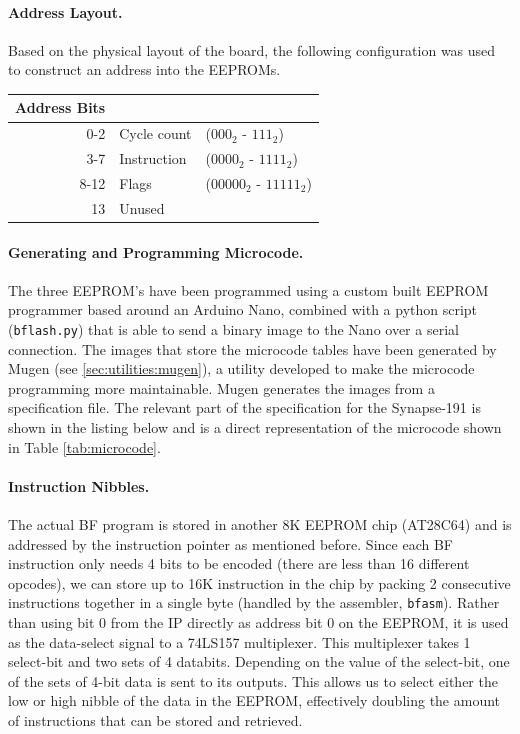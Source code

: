 \paragraph{Address Layout.} Based on the physical layout of the board, the following configuration was used to construct an address into the EEPROMs.
\\
\begin{center}
\begin{tabular}{r|ll} 
  Address Bits & \\ \hline
  0-2  & Cycle count & ($000_2$ - $111_2$) \\
  3-7  & Instruction & ($0000_2$ - $1111_2$) \\
  8-12 & Flags  & ($00000_2$ - $11111_2$) \\
  13   & Unused & 
\end{tabular}
\end{center}


\paragraph{Generating and Programming Microcode.} The three EEPROM's have been programmed using a custom built EEPROM programmer based around an Arduino Nano, combined with a python script (\texttt{bflash.py}) that is able to send a binary image to the Nano over a serial connection. The images that store the microcode tables have been generated by Mugen (see \ref{sec:utilities:mugen}), a utility developed to make the microcode programming more maintainable. Mugen generates the images from a specification file. The relevant part of the specification for the Synapse-191 is shown in the listing below and is a direct representation of the microcode shown in Table \ref{tab:microcode}.

\newpage



\paragraph{Instruction Nibbles.} The actual BF program is stored in another 8K EEPROM chip (AT28C64) and is addressed by the instruction pointer as mentioned before. Since each BF instruction only needs 4 bits to be encoded (there are less than 16 different opcodes), we can store up to 16K instruction in the chip by packing 2 consecutive instructions together in a single byte (handled by the assembler, \texttt{bfasm}). Rather than using bit 0 from the IP directly as address bit 0 on the EEPROM, it is used as the data-select signal to a 74LS157 multiplexer. This multiplexer takes 1 select-bit and two sets of 4 databits. Depending on the value of the select-bit, one of the sets of 4-bit data is sent to its outputs. This allows us to select either the low or high nibble of the data in the EEPROM, effectively doubling the amount of instructions that can be stored and retrieved.

